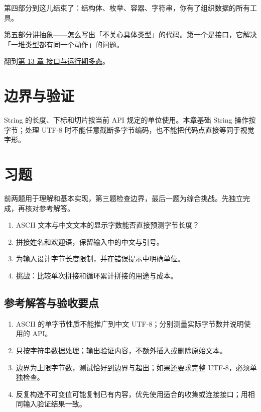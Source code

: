 第四部分到这儿结束了：结构体、枚举、容器、字符串，你有了组织数据的所有工具。

第五部分讲抽象——怎么写出「不关心具体类型」的代码。第一个是接口，它解决「一堆类型都有同一个动作」的问题。

翻到\hyperref[ch:13]{第 13 章 接口与运行期多态}。

\section{边界与验证}

String 的长度、下标和切片按当前 API 规定的单位使用。本章基础 String 操作按字节；处理 UTF-8 时不能任意截断多字节编码，也不能把代码点直接等同于视觉字形。

\section{习题}

前两题用于理解和基本实现，第三题检查边界，最后一题为综合挑战。先独立完成，再核对参考解答。

\begin{enumerate}

\item ASCII 文本与中文文本的显示字数能否直接预测字节长度？

\item 拼接姓名和欢迎语，保留输入中的中文与引号。

\item 为输入设计字节长度限制，并在错误提示中明确单位。

\item 挑战：比较单次拼接和循环累计拼接的用途与成本。

\end{enumerate}

\subsection*{参考解答与验收要点}

\begin{enumerate}

\item ASCII 的单字节性质不能推广到中文 UTF-8；分别测量实际字节数并说明使用的 API。

\item 只按字符串数据处理；输出验证内容，不额外插入或删除原始文本。

\item 边界为上限字节数，测试恰好到边界与超出；如果还要求完整 UTF-8，必须单独检查。

\item 反复构造不可变值可能复制已有内容，优先使用适合的收集或连接接口；用相同输入验证结果一致。

\end{enumerate}

